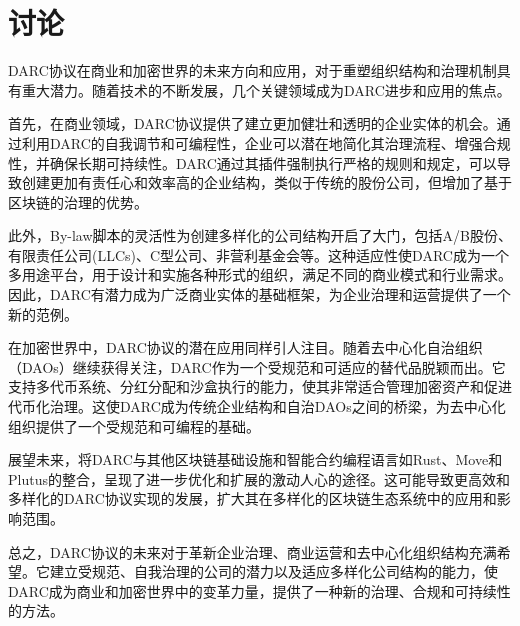 \documentclass[main.tex]{subfiles}
\begin{document}
\section{讨论}

DARC协议在商业和加密世界的未来方向和应用，对于重塑组织结构和治理机制具有重大潜力。随着技术的不断发展，几个关键领域成为DARC进步和应用的焦点。

首先，在商业领域，DARC协议提供了建立更加健壮和透明的企业实体的机会。通过利用DARC的自我调节和可编程性，企业可以潜在地简化其治理流程、增强合规性，并确保长期可持续性。DARC通过其插件强制执行严格的规则和规定，可以导致创建更加有责任心和效率高的企业结构，类似于传统的股份公司，但增加了基于区块链的治理的优势。

此外，By-law脚本的灵活性为创建多样化的公司结构开启了大门，包括A/B股份、有限责任公司(LLCs)、C型公司、非营利基金会等。这种适应性使DARC成为一个多用途平台，用于设计和实施各种形式的组织，满足不同的商业模式和行业需求。因此，DARC有潜力成为广泛商业实体的基础框架，为企业治理和运营提供了一个新的范例。

在加密世界中，DARC协议的潜在应用同样引人注目。随着去中心化自治组织（DAOs）继续获得关注，DARC作为一个受规范和可适应的替代品脱颖而出。它支持多代币系统、分红分配和沙盒执行的能力，使其非常适合管理加密资产和促进代币化治理。这使DARC成为传统企业结构和自治DAOs之间的桥梁，为去中心化组织提供了一个受规范和可编程的基础。

展望未来，将DARC与其他区块链基础设施和智能合约编程语言如Rust、Move和Plutus的整合，呈现了进一步优化和扩展的激动人心的途径。这可能导致更高效和多样化的DARC协议实现的发展，扩大其在多样化的区块链生态系统中的应用和影响范围。

总之，DARC协议的未来对于革新企业治理、商业运营和去中心化组织结构充满希望。它建立受规范、自我治理的公司的潜力以及适应多样化公司结构的能力，使DARC成为商业和加密世界中的变革力量，提供了一种新的治理、合规和可持续性的方法。
\end{document}
